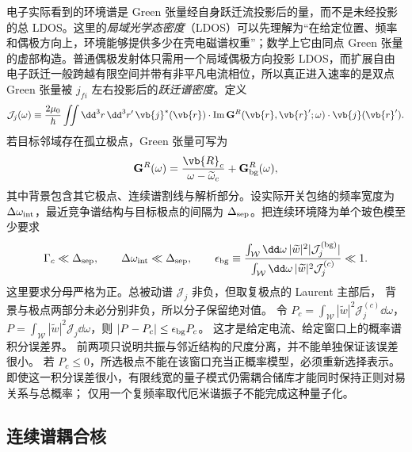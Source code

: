 电子实际看到的环境谱是 Green 张量经自身跃迁流投影后的量，而不是未经投影的总 LDOS。这里的\emph{局域光学态密度}（LDOS）可以先理解为“在给定位置、频率和偶极方向上，环境能够提供多少在壳电磁谱权重”；数学上它由同点 Green 张量的虚部构造。普通偶极发射体只需用一个局域偶极方向投影 LDOS，而扩展自由电子跃迁一般跨越有限空间并带有非平凡电流相位，所以真正进入速率的是双点 Green 张量被 $j_{fi}$ 左右投影后的\emph{跃迁谱密度}。定义
\begin{equation}
\mathcal J_j(\omega)
\equiv\frac{2\mu_0}{\hbar}
\iint\dd^3 r\,\dd^3 r'\,
\vb{j}^*(\vb{r})\cdot
\operatorname{Im}\mathbf G^R(\vb{r},\vb{r}';\omega)
\cdot\vb{j}(\vb{r}').
\label{eq:projected_environment_spectral_density}
\end{equation}
若目标邻域存在孤立极点，Green 张量可写为
\begin{equation}
\mathbf G^R(\omega)
=\frac{\vb{R}_c}{\omega-\widetilde\omega_c}
+\mathbf G_{\rm bg}^R(\omega),
\label{eq:green_isolated_pole_laurent}
\end{equation}
其中背景包含其它极点、连续谱割线与解析部分。设实际开关包络的频率宽度为 $\Delta\omega_{\rm int}$，最近竞争谱结构与目标极点的间隔为 $\Delta_{\rm sep}$。把连续环境降为单个玻色模至少要求
\begin{equation}
{
\Gamma_c\ll\Delta_{\rm sep},
\qquad
\Delta\omega_{\rm int}\ll\Delta_{\rm sep},
\qquad
\epsilon_{\rm bg}
\equiv
\frac{\int_{\mathcal W}\dd\omega\,|\widetilde w|^2|\mathcal J_j^{(\rm bg)}|}
{\int_{\mathcal W}\dd\omega\,|\widetilde w|^2\mathcal J_j^{(c)}}\ll1.}
\label{eq:single_mode_pole_projection_conditions}
\end{equation}
这里要求分母严格为正。总被动谱 $\mathcal J_j$ 非负，但取复极点的 Laurent 主部后，
背景与极点两部分未必分别非负，所以分子保留绝对值。
令 $P_c=\int_{\mathcal W}|\widetilde w|^2\mathcal J_j^{(c)}\dd\omega$，
$P=\int_{\mathcal W}|\widetilde w|^2\mathcal J_j\dd\omega$，则
$|P-P_c|\le\epsilon_{\rm bg}P_c$。
这才是给定电流、给定窗口上的概率谱积分误差界。
前两项只说明共振与邻近结构的尺度分离，并不能单独保证该误差很小。
若 $P_c\le0$，所选极点不能在该窗口充当正概率模型，必须重新选择表示。
即使这一积分误差很小，有限线宽的量子模式仍需耦合储库才能同时保持正则对易关系与总概率；
仅用一个复频率取代厄米谐振子不能完成这种量子化。




\subsection{连续谱耦合核}\label{sec:electron-continuum-coupling}

